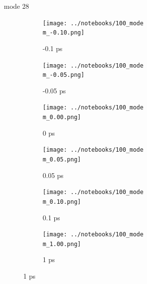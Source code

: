 \documentclass{beamer}
\begin{document}
\renewcommand\m{28}
\begin{frame}{mode \m}
	\begin{figure}
		\centering
		\begin{subfigure}[b]{\w\textwidth}
			\centering
			\texttt{[image: ../notebooks/100\_mode\\m\_-0.10.png]}
			\caption{-0.1 ps}
		\end{subfigure}
		\begin{subfigure}[b]{\w\textwidth}
			\centering
			\texttt{[image: ../notebooks/100\_mode\\m\_-0.05.png]}
			\caption{-0.05 ps}
		\end{subfigure}
		\begin{subfigure}[b]{\w\textwidth}
			\centering
			\texttt{[image: ../notebooks/100\_mode\\m\_0.00.png]}
			\caption{0 ps}
		\end{subfigure}
		\begin{subfigure}[b]{\w\textwidth}
			\centering
			\texttt{[image: ../notebooks/100\_mode\\m\_0.05.png]}
			\caption{0.05 ps}
		\end{subfigure}
		\begin{subfigure}[b]{\w\textwidth}
			\centering
			\texttt{[image: ../notebooks/100\_mode\\m\_0.10.png]}
			\caption{0.1 ps}
		\end{subfigure}
		\begin{subfigure}[b]{\w\textwidth}
			\centering
			\texttt{[image: ../notebooks/100\_mode\\m\_1.00.png]}
			\caption{1 ps}
		\end{subfigure}
	\end{figure}
\end{frame}
\end{document}
